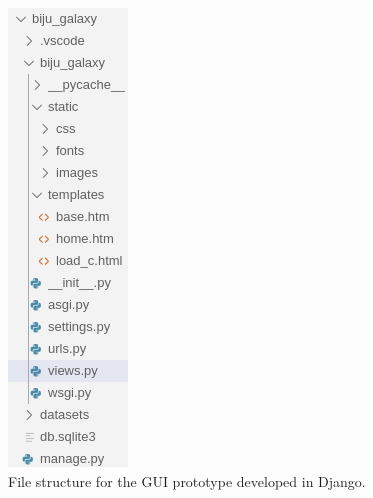 \begin{figure}[H]
	\centering
	\includegraphics[width=.3\linewidth, height=\textheight, keepaspectratio]{images/code/dvs.png}
	\caption{File structure for the GUI prototype developed in Django.}
	\label{fig:dvs}
\end{figure}

